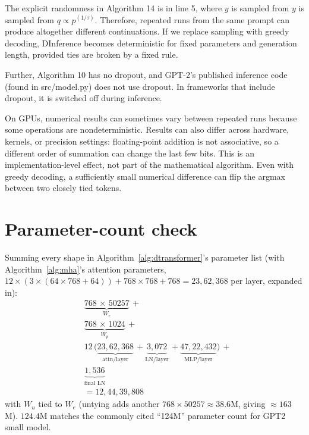 \documentclass[12pt]{article}
\begin{document}
The explicit randomness in Algorithm 14 is in line 5,
where \(y\) is sampled from $y$ is sampled
from $q \propto p^(1/\tau)$. Therefore, repeated runs
from the same prompt can produce altogether different continuations.
If we replace sampling with greedy decoding, DInference
becomes deterministic for fixed parameters and
generation length, provided ties are broken by
a fixed rule.

Further, Algorithm 10 has no dropout, and GPT-2's
published inference code (found in src/model.py) does not
use dropout. In frameworks that include dropout,
it is switched off during inference.

On GPUs, numerical results can sometimes vary between
repeated runs because some operations are nondeterministic.
Results can also differ across hardware, kernels, or
precision settings: floating-point addition is not associative,
so a different order of summation can change the last few bits.
This is an implementation-level effect, not part of the
mathematical algorithm. Even with greedy decoding,
a sufficiently small numerical difference can flip the
argmax between two closely tied tokens.

\newpage

\section*{Parameter-count check}
Summing every shape in Algorithm~\ref{alg:dtransformer}'s
parameter list (with Algorithm~\ref{alg:mha}'s attention parameters,
$12\times(3\times(64{\times}768+64))+768{\times}768+768=23{,}62{,}368$
per layer, expanded in):
\begin{align*}
    & \underbrace{768\,{\times}\,50257}_{W_e} \, + \\[2pt]
    & \underbrace{768\,{\times}\,1024}_{W_p} \, + \\[2pt]
    & 12\,\big(\underbrace{23{,}62{,}368}_{\text{attn/layer}} \, +
    \underbrace{3{,}072}_{\text{LN/layer}} \, +
    \underbrace{47{,}22{,}432}_{\text{MLP/layer}}\big) \, + \\[2pt]
    & \underbrace{1{,}536}_{\text{final LN}} \\[2pt]
    & = 12{,}44{,}39{,}808
\end{align*}
with $W_u$ tied to $W_e$ (untying adds another $768{\times}50257\approx38.6$M, giving $\approx163$M).
$124.4$M matches the commonly cited ``124M'' parameter count for GPT2 small model.
\end{document}
